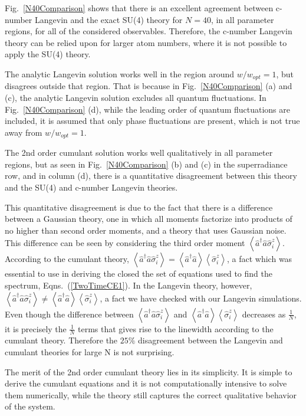\documentclass[aps,prl,twocolumn,
superscriptaddress,groupedaddress]{revtex4}
\begin{document}
Fig.~\ref{N40Comparison} shows that there is an excellent agreement
between c-number Langevin and the exact SU(4) theory for $N=40$, in all
parameter regions, for all of the considered observables. Therefore, the
c-number Langevin theory can be relied upon for larger atom numbers,
where it is not possible to apply the SU(4) theory.

The analytic Langevin solution works well in the region around
$w/w_{opt}=1$, but disagrees outside that region. That is because in
Fig.~\ref{N40Comparison} (a) and (c), the analytic Langevin solution
excludes all quantum fluctuations. In Fig.~\ref{N40Comparison} (d),
while the leading order of quantum fluctuations are included, it is
assumed that only phase fluctuations are present, which is not true away
from $w/w_{opt}=1$.

The 2nd order cumulant solution works well qualitatively in all
parameter regions, but as seen in Fig.~\ref{N40Comparison} (b) and (c)
in the superradiance row, and in column (d), there is a quantitative
disagreement between this theory and the SU(4) and c-number Langevin
theories.

This quantitative disagreement is due to the fact that there is a
difference between a Gaussian theory, one in which all moments factorize
into products of no higher than second order moments, and a theory that
uses Gaussian noise. This difference can be seen by considering the
third order moment $\left< \hat{a}^{\dagger}\hat{a}\hat{\sigma}_i^z
\right>$. According to the cumulant theory, $\left<
\hat{a}^{\dagger}\hat{a}\hat{\sigma}_i^z \right>=\left<
\hat{a}^{\dagger}\hat{a}\right> \left<\hat{\sigma}_i^z \right>$, a fact
which was essential to use in deriving the closed the set of equations
used to find the spectrum, Eqns.~(\ref{TwoTimeCE1}). In the Langevin
theory, however, $\left< \hat{a}^{\dagger}\hat{a}\hat{\sigma}_i^z
\right> \neq \left< \hat{a}^{\dagger}\hat{a}\right>
\left<\hat{\sigma}_i^z \right>$, a fact we have checked with our
Langevin simulations. Even though the difference between $\left<
\hat{a}^{\dagger}\hat{a}\hat{\sigma}_i^z \right>$ and $\left<
\hat{a}^{\dagger}\hat{a}\right> \left<\hat{\sigma}_i^z \right>$
decreases as $\frac{1}{N}$, it is precisely the $\frac{1}{N}$ terms that
gives rise to the linewidth according to the cumulant theory.  Therefore
the $25\%$ disagreement between the Langevin and cumulant theories for
large N is not surprising.

The merit of the 2nd order cumulant theory lies in its simplicity. It is
simple to derive the cumulant equations and it is not computationally
intensive to solve them numerically, while the theory still captures the
correct qualitative behavior of the system.
\end{document}
